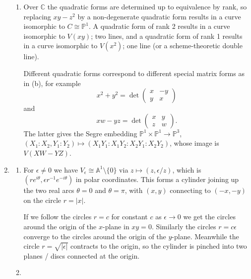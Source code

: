 \documentclass{article}
\theoremstyle{definition}
\renewcommand{\P}{\mathbb{P}}
\newcommand{\A}{\mathbb{A}}
\newcommand{\C}{\mathbb{C}}
\begin{document}
\begin{enumerate}
\begin{enumerate}[label=(\alph*)]
\item
Over $\C$ the quadratic forms are determined up to equivalence by rank, so
replacing $xy-z^2$ by a non-degenerate quadratic form results in a curve
isomorphic to $C\cong\P^1$. A quadratic form of rank 2 results in a curve
isomorphic to $V(xy)$; two lines, and a quadratic form of rank 1 results in a
curve isomorphic to $V(x^2)$; one line (or a scheme-theoretic double line).

Different quadratic forms correspond to different special matrix forms as in
(b), for example
\begin{equation*}
    x^2 + y^2 = \det\begin{pmatrix}
        x & -y \\
        y & x
    \end{pmatrix}
\end{equation*}
and
\begin{equation*}
    xw - yz = \det\begin{pmatrix}
        x & y \\ z & w
    \end{pmatrix}.
\end{equation*}
The latter gives the Segre embedding $\P^1\times\P^1\to\P^3$,
$(X_1:X_2,Y_1:Y_2)\mapsto(X_1Y_1:X_1Y_2:X_2Y_1:X_2Y_2)$, whose image is
$V(XW-YZ)$.

\end{enumerate}

\item
\begin{enumerate}[label=(\alph*)]

\item
For $\epsilon\ne0$ we have $V_\epsilon\cong\A^1\setminus\{0\}$ via
$z\mapsto(z,\epsilon/z)$, which is
$(re^{i\theta},\epsilon r^{-1}e^{-i\theta})$
in polar coordinates. This forms a cylinder joining up the two real arcs
$\theta=0$ and $\theta=\pi$, with $(x,y)$ connecting to $(-x,-y)$ on the circle
$r=|x|$.


If we follow the circles $r=c$ for constant $c$ as $\epsilon\to0$ we get the
circles around the origin of the $x$-plane in $xy=0$. Similarly the circles
$r=c\epsilon$ converge to the circles around the origin of the $y$-plane.
Meanwhile the circle $r=\sqrt{|\epsilon|}$ contracts to the origin, so the
cylinder is pinched into two planes / discs connected at the origin.

\item %

\end{enumerate}

\end{enumerate}
\end{document}
